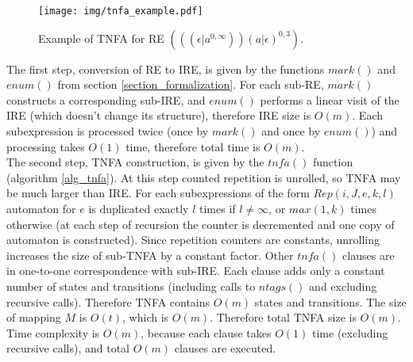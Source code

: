 \documentclass[AMA,STIX1COL]{WileyNJD-v2}
\newcommand{\Rep}{Rep}
\begin{document}

\begin{figure}
\texttt{[image: img/tnfa\_example.pdf]}
\vspace{-2em}
\caption{Example of TNFA for RE
$(((\epsilon|a^{0,\infty}))(a|\epsilon)^{0,3})$.}\label{fig:tnfa_example}
\end{figure}

The first step, conversion of RE to IRE, is given by the functions $mark()$ and $enum()$ from section \ref{section_formalization}.
%
For each sub-RE, $mark()$ constructs a corresponding sub-IRE,
and $enum()$ performs a linear visit of the IRE (which doesn't change its structure),
therefore IRE size is $O(m)$.
%
Each subexpression is processed twice (once by $mark()$ and once by $enum()$)
and processing takes $O(1)$ time, therefore total time is $O(m)$.
\\

The second step, TNFA construction, is given by the $tn\!f\!a()$ function (algorithm \ref{alg_tnfa}).
At this step counted repetition is unrolled, so TNFA may be much larger than IRE.
For each subexpressions of the form $\Rep(i, J, e, k, l)$ automaton for $e$ is duplicated exactly $l$ times if $l \neq \infty$, or $max(1, k)$ times otherwise
(at each step of recursion the counter is decremented and one copy of automaton is constructed).
Since repetition counters are constants, unrolling increases the size of sub-TNFA by a constant factor.
Other $tn\!f\!a()$ clauses are in one-to-one correspondence with sub-IRE.
Each clause adds only a constant number of states and transitions (including calls to $ntags()$ and excluding recursive calls).
Therefore TNFA contains $O(m)$ states and transitions.
The size of mapping $M$ is $O(t)$, which is $O(m)$.
Therefore total TNFA size is $O(m)$.
Time complexity is $O(m)$, because each clause takes $O(1)$ time (excluding recursive calls), and total $O(m)$ clauses are executed.
\\
\end{document}

